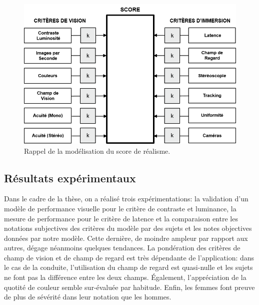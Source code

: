 	\begin{figure}
		\centering
		\includegraphics[scale=1]{Figures/ScoreRealismeMini}
		\caption{Rappel de la modélisation du score de réalisme.}
		\label{fig:score_realisme_mini}
	\end{figure}
	
	\subsection*{Résultats expérimentaux}
	\par Dans le cadre de la thèse, on a réalisé trois expérimentations: la validation d'un modèle de performance visuelle pour le critère de contraste et luminance, la mesure de performance pour le critère de latence et la comparaison entre les notations subjectives des critères du modèle par des sujets et les notes objectives données par notre modèle. Cette dernière, de moindre ampleur par rapport aux autres, dégage néanmoins quelques tendances. La pondération des critères de champ de vision et de champ de regard est très dépendante de l'application: dans le cas de la conduite, l'utilisation du champ de regard est quasi-nulle et les sujets ne font pas la différence entre les deux champs. Également, l'appréciation de la quotité de couleur semble sur-évaluée par habitude. Enfin, les femmes font preuve de plus de sévérité dans leur notation que les hommes.
	
